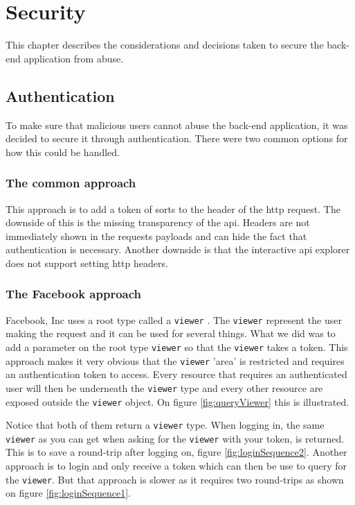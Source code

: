 \chapter{Security}
This chapter describes the considerations and decisions taken to secure the back-end application from abuse.

\section{Authentication}
To make sure that malicious users cannot abuse the back-end application, it was decided to secure it through authentication. 
There were two common options for how this could be handled. 

\subsection{The common approach}
This approach is to add a token of sorts to the header of the \gls{http} request. 
The downside of this is the missing transparency of the \gls{api}.
Headers are not immediately shown in the requests payloads and can hide the fact that authentication is necessary.
Another downside is that the interactive \gls{api} explorer  does not support setting \gls{http} headers.

\subsection{The Facebook approach}
Facebook, Inc uses a root type called a \verb+viewer+ \citep{facebook:viewer}. 
The \verb+viewer+ represent the user making the request and it can be used for several things. 
What we did was to add a parameter on the root type \verb+viewer+ so that the \verb+viewer+ takes a token. 
This approach makes it very obvious that the \verb+viewer+ 'area' is restricted and requires an authentication token to access. 
Every resource that requires an authenticated user will then be underneath the \verb+viewer+ type and every other resource are exposed outside the \verb+viewer+ object. 
On figure \ref{fig:queryViewer} this is illustrated.


Notice that both of them return a \verb+viewer+ type. 
When logging in, the same \verb+viewer+ as you can get when asking for the \verb+viewer+ with your token, is returned. 
This is to save a round-trip after logging on, figure \ref{fig:loginSequence2}. 
Another approach is to login and only receive a token which can then be use to query for the \verb+viewer+. 
But that approach is slower as it requires two round-trips as shown on figure \ref{fig:loginSequence1}.

